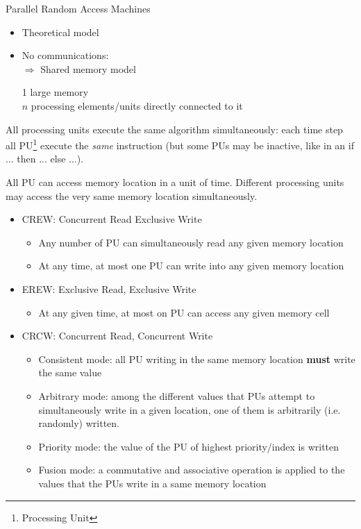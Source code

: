 Parallel Random Access Machines

\begin{itemize}
\item Theoretical model
\item No communications:\\
$\Rightarrow$ Shared memory model

1 large memory\\
$n$ processing elements/units directly connected to it
\end{itemize}

All processing units execute the same algorithm simultaneously: each time step all PU\footnote{Processing Unit} execute the \emph{same} instruction (but some PUs may be inactive, like in an if ... then ... else ...).


All PU can access memory location in a unit of time. Different processing units may access the very same memory location simultaneously. 

\begin{itemize}
\item CREW: Concurrent Read Exclusive Write
\begin{itemize}
\item  Any number of PU can simultaneously read any given memory location
\item At any time, at most one PU can write into any given memory location
\end{itemize}
\item EREW: Exclusive Read, Exclusive Write
\begin{itemize}
\item At any given time, at most on PU can access any given memory cell
\end{itemize}

\item CRCW: Concurrent Read, Concurrent Write
\begin{itemize}
\item Consistent mode: all PU writing in the same memory location \textbf{must} write the same value
\item Arbitrary mode: among the different values that PUs attempt to simultaneously write in a given location, one of them is arbitrarily (i.e. randomly) written.
\item Priority mode: the value of the PU of highest priority/index is written
\item Fusion mode: a commutative and associative operation is applied to the values that the PUs write in a same memory location
\end{itemize}
\end{itemize}



